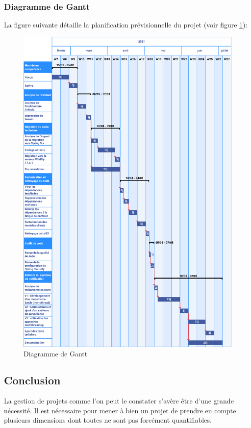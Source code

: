 \subsubsection{Diagramme de Gantt}
La figure suivante détaille la planification prévisionnelle du projet (voir figure \ref{fig:gantt}):\\
\begin{figure}[H]
    \begin{center}
        \includegraphics[width=\linewidth]{images/sec3/gantt.pdf}
        \caption{Diagramme de Gantt}
        \label{fig:gantt}
    \end{center}
\end{figure}

\subsection*{Conclusion}
La gestion de projets comme l’on peut le constater s’avère être d’une grande nécessité. Il est nécessaire pour mener à bien un projet de prendre en compte plusieurs dimensions dont toutes ne sont pas forcément quantifiables.\\

